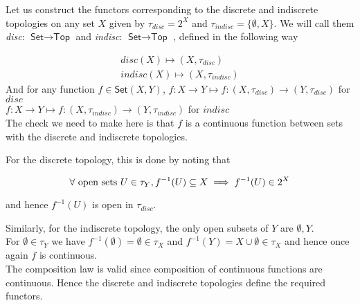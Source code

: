 \begin{frame}
    
Let us construct the functors corresponding to the discrete and indiscrete
topologies on any set \(X\) given by \(\tau_{disc} = 2^X\) and \(\tau_{indisc} =
\{\emptyset,X \}\). We will call them \textit{disc}: \(\textsf{Set} \to
\textsf{Top}\) and \textit{indisc}: \(\textsf{Set}\to \textsf{Top}\) , defined
in the following way 

\begin{gather*}
    \textit{disc}(X) \mapsto (X, \tau_{disc}) \\
    \textit{indisc}(X) \mapsto (X,\tau_{indisc}) 
\end{gather*}
And for any function \(f \in \textsf{Set}(X,Y)\), \(f:X\to Y\mapsto f:(X,
\tau_{disc})\to(Y,\tau_{disc})\) for \(disc\) \\ \(f:X\to Y\mapsto f:(X,
\tau_{indisc})\to(Y,\tau_{indisc})\) for \(indisc\) 
\\ \pause
The check we need to make here is that \(f\) is a continuous function between
sets with the discrete and indiscrete topologies. 
\end{frame}

\begin{frame}
    
 For the discrete topology, this is done by noting that 
 
 \begin{equation}
    \forall \textnormal{ open sets } U \in \tau_Y , f^{-1} (U) \subseteq X \implies f^{-1} (U)\in 2^X
 \end{equation}

    and hence \(f^{-1}(U)\) is open in \(\tau_{disc}\). 

\end{frame}
\begin{frame}
  Similarly, for the indiscrete topology, the only open subsets of \(Y\) are
    \({\emptyset,Y}\).  \\ For \(\emptyset \in \tau_Y\) we have
    \(f^{-1}(\emptyset) = \emptyset \in \tau_X \) and \(f^{-1}(Y) = X \cup
    \emptyset \in \tau_X \)  %
and hence once again \(f\) is continuous. \\The composition law is valid since
composition of continuous functions are continuous. Hence the discrete and
indiscrete topologies define the required functors. 

\end{frame}

